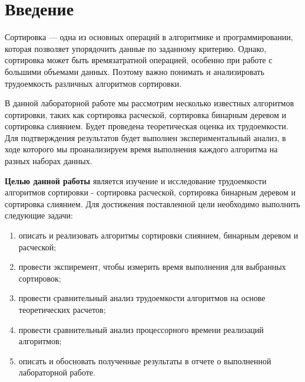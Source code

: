 \chapter*{Введение}

Сортировка --- одна из основных операций в алгоритмике и программировании, которая позволяет упорядочить данные по заданному критерию. Однако, сортировка может быть времязатратной операцией, особенно при работе с большими объемами данных. Поэтому важно понимать и анализировать трудоемкость различных алгоритмов сортировки.

В данной лабораторной работе мы рассмотрим несколько известных алгоритмов сортировки, таких как сортировка расческой, сортировка бинарным деревом и сортировка слиянием. Будет проведена теоретическая оценка их трудоемкости. Для подтверждения результатов будет выполнен экспериментальный анализ, в ходе которого мы проанализируем время выполнения каждого алгоритма на разных наборах данных.


\textbf{Целью данной работы} является изучение и исследование трудоемкости алгоритмов сортировки - сортировка расческой, сортировка бинарным деревом и сортировка слиянием.
Для достижения поставленной цели необходимо выполнить следующие задачи:
\begin{enumerate}
	\item описать и реализовать алгоритмы сортировки слиянием, бинарным деревом и расческой;
    \item провести экспиремент, чтобы измерить время выполнения для выбранных сортировок;
    \item провести сравнительный анализ трудоемкости алгоритмов на основе теоретических расчетов;
    \item провести сравнительный анализ процессорного времени реализаций алгоритмов;
	\item описать и обосновать полученные результаты в отчете о выполненной лабораторной работе.
\end{enumerate}